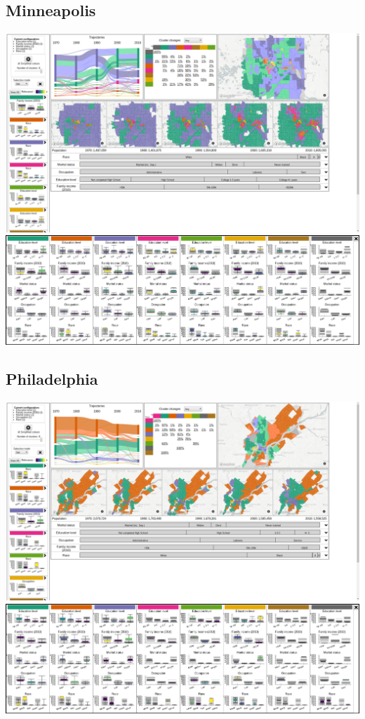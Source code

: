 \documentclass[a4paper]{article}
\begin{document}
\subsection{Minneapolis}
\begin{center}
	\includegraphics[width=\linewidth]{31a.png}
	\includegraphics[width=\linewidth]{31b.png}
\end{center} \clearpage



\subsection{Philadelphia}
\begin{center}
	\includegraphics[width=\linewidth]{32a.png}
	\includegraphics[width=\linewidth]{32b.png}
\end{center} \clearpage
\end{document}
